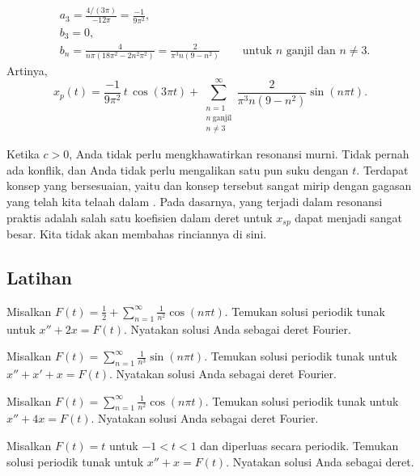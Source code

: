 \begin{example}
\begin{align*}
& a_3 = \frac{4/(3\pi)}{-12\pi} = \frac{-1}{9\pi^2} , \\
& b_3 = 0 , \\
& b_n = \frac{4}{n\pi(18\pi^2 - 2n^2 \pi^2)} 
= \frac{2}{\pi^3 n(9 - n^2)} \qquad \text{untuk } n \text{ ganjil dan } n \neq 3 .
\end{align*}
Artinya,
\begin{equation*}
x_p(t) =
\frac{-1}{9\pi^2}
\,
t \, \cos (3 \pi t)
+
\sum_{\substack{n=1 \\ n~\text{ganjil} \\ n \neq 3}}^\infty
\frac{2}{\pi^3 n(9 - n^2)}
\sin (n \pi t) . 
\end{equation*}
\end{example}

Ketika $c > 0$, Anda tidak perlu mengkhawatirkan resonansi murni.
Tidak pernah ada konflik, dan Anda tidak perlu mengalikan satu pun
suku dengan $t$.  Terdapat konsep yang bersesuaian, yaitu
dan konsep tersebut sangat mirip dengan gagasan yang telah kita telaah dalam
.
Pada dasarnya, yang terjadi dalam resonansi praktis adalah salah satu
koefisien dalam deret untuk $x_{sp}$ dapat menjadi sangat besar.  Kita tidak akan
membahas rinciannya di sini.

\subsection{Latihan}

\begin{exercise}
Misalkan $F(t) = \frac{1}{2} + \sum_{n=1}^\infty \frac{1}{n^2} \cos (n \pi t)$.
Temukan
solusi periodik tunak untuk
$x'' + 2 x = F(t)$.  Nyatakan solusi Anda sebagai deret Fourier.
\end{exercise}

\begin{exercise}
Misalkan $F(t) = \sum_{n=1}^\infty \frac{1}{n^3} \sin (n \pi t)$.  Temukan
solusi periodik tunak untuk
$x'' + x' + x = F(t)$.  Nyatakan solusi Anda sebagai deret Fourier.
\end{exercise}

\begin{exercise}
Misalkan $F(t) = \sum_{n=1}^\infty \frac{1}{n^2} \cos (n \pi t)$.  Temukan
solusi periodik tunak untuk
$x'' + 4 x = F(t)$.  Nyatakan solusi Anda sebagai deret Fourier.
\end{exercise}

\begin{exercise}
Misalkan $F(t) = t$ untuk $-1 < t < 1$ dan diperluas secara periodik.
Temukan solusi periodik tunak untuk
$x'' + x = F(t)$.  Nyatakan solusi Anda sebagai deret.
\end{exercise}

